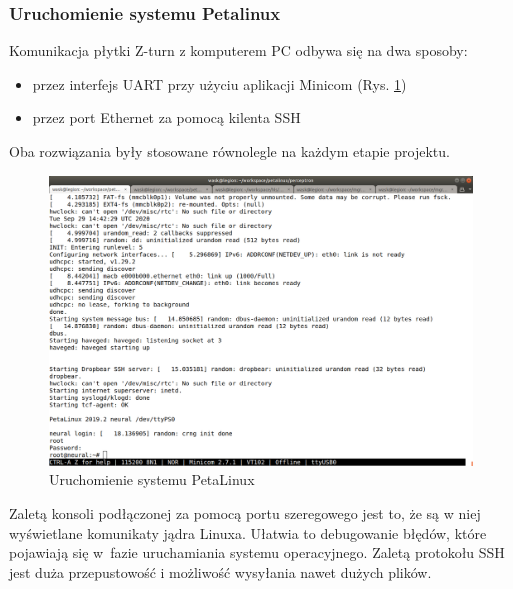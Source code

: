 \subsubsection{Uruchomienie systemu Petalinux}

Komunikacja płytki Z-turn z komputerem PC odbywa się na dwa sposoby:
\begin{itemize}
  \item przez interfejs UART przy użyciu aplikacji Minicom (Rys. \ref{petalinux-boot})
  \item przez port Ethernet za pomocą kilenta SSH 
\end{itemize}
Oba rozwiązania były stosowane równolegle na każdym etapie projektu. 

\begin{figure}[!h]
  \centering
  \includegraphics[width=\textwidth]{img/petalinux-boot.png}
  \caption{Uruchomienie systemu PetaLinux}
  \label{petalinux-boot}
\end{figure}

Zaletą konsoli podłączonej za pomocą portu szeregowego jest to, że są w niej wyświetlane komunikaty jądra Linuxa. Ułatwia to debugowanie błędów, które pojawiają się w~fazie uruchamiania systemu operacyjnego. Zaletą protokołu SSH jest duża przepustowość i możliwość wysyłania nawet dużych plików.



